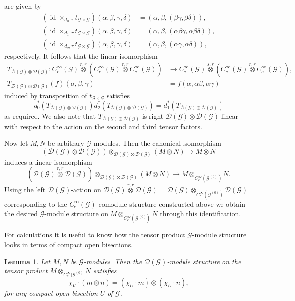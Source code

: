 \documentclass{amsart}
\newtheorem{lemma}[thm]{Lemma}
\newcommand{\G}{\mathcal{G}}
\newcommand{\DG}{\mathcal{D}(\mathcal{G})}
\newcommand{\ccinfty}{C_c^\infty}
\DeclareMathOperator{\id}{id}
\begin{document}
are given by 
\begin{align*}
(\id \times_{d_0,\pi} t_{\G \times \G})(\alpha,\beta,\gamma, \delta) &= (\alpha, \beta, (\beta \gamma, \beta \delta)), \\
(\id \times_{d_1,\pi} t_{\G \times \G})(\alpha,\beta,\gamma, \delta) &= (\alpha, \beta, (\alpha\beta\gamma, \alpha\beta \delta)),\\
(\id \times_{d_2,\pi} t_{\G \times \G})(\alpha,\beta,\gamma, \delta) &=(\alpha, \beta, (\alpha\gamma, \alpha \delta)), 
\end{align*}
respectively. It follows that the linear isomorphism
\begin{align*}
T_{\DG \otimes \DG}: \ccinfty(\G)\stackrel{r,r}{\otimes} (\ccinfty(\G)\stackrel{r,r}{\otimes}\ccinfty(\G))&\rightarrow \ccinfty(\G)\stackrel{s,r}{\otimes}(\ccinfty(\G)\stackrel{r,r}{\otimes}\ccinfty(\G)), 
\\
T_{\DG \otimes \DG}(f)(\alpha, \beta, \gamma) &=f(\alpha,\alpha\beta,\alpha\gamma)
\end{align*}
induced by transposition of $ t_{\G \times \G} $ satisfies 
$$ 
d_0^*(T_{\DG \otimes \DG}) d_2^*(T_{\DG \otimes \DG}) = d_1^*(T_{\DG \otimes \DG}) 
$$ 
as required. We also note that $ T_{\DG \otimes \DG} $ is right $ \DG \otimes \DG $-linear with respect to the action on the second and third tensor factors. 

Now let $ M, N $ be arbitrary $ \G $-modules. Then the canonical isomorphism 
$$
(\DG \otimes \DG) \otimes_{\DG \otimes \DG} (M\otimes N) \rightarrow M\otimes N
$$
induces a linear isomorphism 
$$
(\DG \stackrel{r,r}{\otimes} \DG)\otimes_{\DG \otimes \DG} (M\otimes N) \rightarrow M \otimes_{\ccinfty(\G^{(0)})} N. 
$$
Using the left $ \DG $-action on $ \DG \stackrel{r,r}{\otimes} \DG = \DG \otimes_{\ccinfty(\G^{(0)})} \DG $ corresponding to the $ \ccinfty(\G) $-comodule structure constructed above we obtain the desired $ \G $-module structure on $ M \otimes_{\ccinfty(\G^{(0)})} N $ through this identification. 

For calculations it is useful to know how the tensor product $ \G $-module structure looks in terms of compact open bisections.

\begin{lemma} \label{lemma:how diagonal action works}
Let $ M, N $ be $ \G $-modules. Then the $ \DG $-module structure on the tensor product  $ M \otimes_{\ccinfty(\G^{(0)}} N $ satisfies 
$$ 
\chi_U \cdot(m \otimes n) = (\chi_U \cdot m) \otimes (\chi_U \cdot n), 
$$ 
for any compact open bisection $ U $ of $ \G $. 
\end{lemma} 
\end{document}
